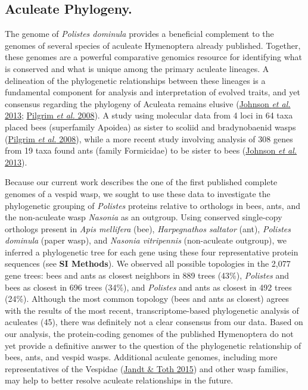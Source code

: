 \subsection{Aculeate Phylogeny.} The genome of \textit{Polistes dominula}
provides a beneficial complement to the genomes of several species of
aculeate Hymenoptera already published. Together, these genomes are a
powerful comparative genomics resource for identifying what is conserved
and what is unique among the primary aculeate lineages. A delineation of
the phylogenetic relationships between these lineages is a fundamental
component for analysis and interpretation of evolved traits, and yet
consensus regarding the phylogeny of Aculeata remains elusive
(\protect\hyperlink{ux5fENREFux5f22}{Johnson \textit{et al.} 2013};
\protect\hyperlink{ux5fENREFux5f44}{Pilgrim \textit{et al.} 2008}). A
study using molecular data from 4 loci in 64 taxa placed bees
(superfamily Apoidea) as sister to scoliid and bradynobaenid wasps
(\protect\hyperlink{ux5fENREFux5f44}{Pilgrim \textit{et al.} 2008}), while
a more recent study involving analysis of 308 genes from 19 taxa found
ants (family Formicidae) to be sister to bees
(\protect\hyperlink{ux5fENREFux5f22}{Johnson \textit{et al.} 2013}).

Because our current work describes the one of the first published
complete genomes of a vespid wasp, we sought to use these data to
investigate the phylogenetic grouping of \textit{Polistes} proteins
relative to orthologs in bees, ants, and the non-aculeate wasp
\textit{Nasonia} as an outgroup. Using conserved single-copy orthologs
present in \textit{Apis mellifera} (bee), \textit{Harpegnathos saltator}
(ant), \textit{Polistes dominula} (paper wasp), and \textit{Nasonia
vitripennis} (non-aculeate outgroup), we inferred a phylogenetic tree
for each gene using these four representative protein sequences (see
\textbf{SI Methods}). We observed all possible topologies in the 2,077
gene trees: bees and ants as closest neighbors in 889 trees (43\%),
\textit{Polistes} and bees as closest in 696 trees (34\%), and
\textit{Polistes} and ants as closest in 492 trees (24\%). Although the
most common topology (bees and ants as closest) agrees with the results
of the most recent, transcriptome-based phylogenetic analysis of
aculeates (45), there was definitely not a clear consensus from our
data. Based on our analysis, the protein-coding genomes of the published
Hymenoptera do not yet provide a definitive answer to the question of
the phylogenetic relationship of bees, ants, and vespid wasps.
Additional aculeate genomes, including more representatives of the
Vespidae (\protect\hyperlink{ux5fENREFux5f21}{Jandt \& Toth 2015}) and
other wasp families, may help to better resolve aculeate relationships
in the future.

